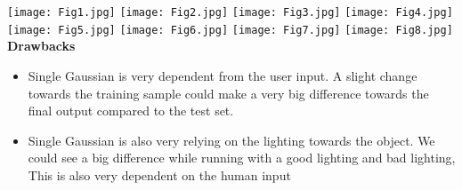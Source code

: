 \documentclass{article}
\begin{document}
\texttt{[image: Fig1.jpg]}
\texttt{[image: Fig2.jpg]}
\texttt{[image: Fig3.jpg]}
\texttt{[image: Fig4.jpg]}
\texttt{[image: Fig5.jpg]}
\texttt{[image: Fig6.jpg]}
\texttt{[image: Fig7.jpg]}
\texttt{[image: Fig8.jpg]}
\textbf{Drawbacks}
\begin{itemize}
    \item Single Gaussian is very dependent from the user input. A slight change towards the training sample could make a very big difference towards the final output compared to the test set. 
    \item Single Gaussian is also very relying on the lighting towards the object. We could see a big difference while running with a good lighting and bad lighting, This is also very dependent on the human input
\end{itemize}
\end{document}
